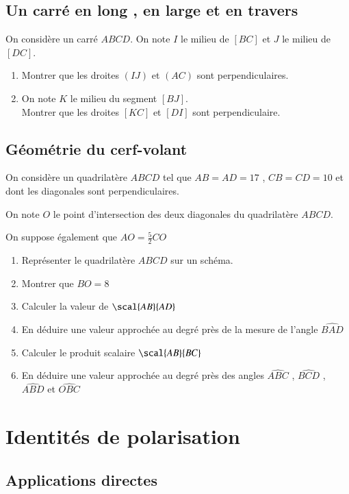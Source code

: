 \documentclass[oneside,12pt]{article}          %
\begin{document}
\subsection{Un carré en long , en large et en travers}

On considère un carré $ABCD$. On note $I$ le milieu de $[BC]$ et $J$ le milieu de $[DC]$.
\begin{enumerate}
    \item Montrer que les droites $(IJ)$ et $(AC)$ sont perpendiculaires.
    \item On note $K$ le milieu du segment $[BJ]$. \\
    Montrer que les droites $[KC]$ et $[DI]$ sont perpendiculaire.
\end{enumerate}



\subsection{Géométrie du cerf-volant}

On considère un quadrilatère $ABCD$ tel que $AB=AD=17$ , $CB=CD=10$ et dont les diagonales sont perpendiculaires.

On note $O$ le point d'intersection des deux diagonales du quadrilatère $ABCD$.

On suppose également que $AO=\frac{5}{2}CO$


\begin{enumerate}
    \item Représenter le quadrilatère $ABCD$ sur un schéma.
    \item Montrer que $BO=8$
    \item Calculer la valeur de $\scal{AB}{AD}$
    \item En déduire une valeur approchée au degré près de la mesure de l'angle $\widehat{BAD}$
    \item Calculer le produit scalaire $\scal{AB}{BC}$
    \item En déduire une valeur approchée au degré près des angles $\widehat{ABC}$ , $\widehat{BCD}$ , $\widehat{ABD}$ et $\widehat{OBC}$
\end{enumerate}



\section{Identités de polarisation}


\subsection{Applications directes}
\end{document}
